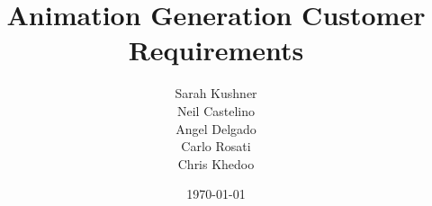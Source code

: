 \documentclass{report}
\begin{document}
\title{Animation Generation Customer Requirements}
\author{Sarah Kushner \\
		Neil Castelino \\
		Angel Delgado \\
		Carlo Rosati \\
		Chris Khedoo}
\date{\today}
\maketitle
\small





\end{document}
